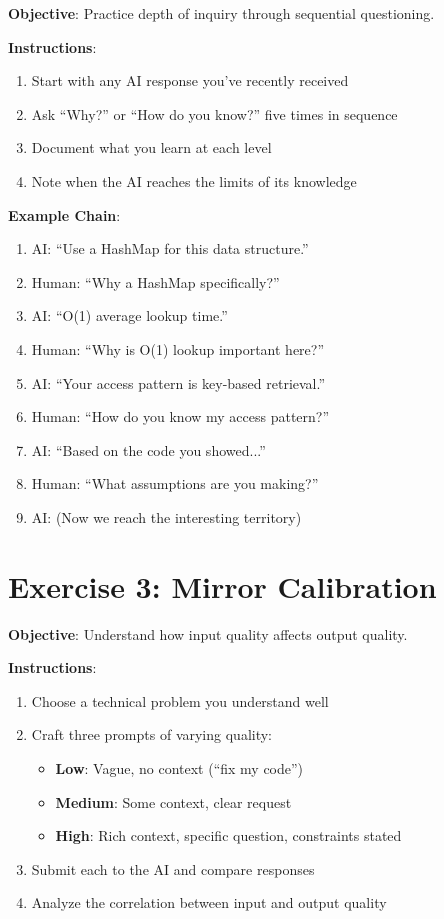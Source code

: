 \textbf{Objective}: Practice depth of inquiry through sequential questioning.

\textbf{Instructions}:
\begin{enumerate}
    \item Start with any AI response you've recently received
    \item Ask ``Why?'' or ``How do you know?'' five times in sequence
    \item Document what you learn at each level
    \item Note when the AI reaches the limits of its knowledge
\end{enumerate}

\textbf{Example Chain}:
\begin{enumerate}
    \item AI: ``Use a HashMap for this data structure.''
    \item Human: ``Why a HashMap specifically?''
    \item AI: ``O(1) average lookup time.''
    \item Human: ``Why is O(1) lookup important here?''
    \item AI: ``Your access pattern is key-based retrieval.''
    \item Human: ``How do you know my access pattern?''
    \item AI: ``Based on the code you showed...''
    \item Human: ``What assumptions are you making?''
    \item AI: (Now we reach the interesting territory)
\end{enumerate}

\section{Exercise 3: Mirror Calibration}

\textbf{Objective}: Understand how input quality affects output quality.

\textbf{Instructions}:
\begin{enumerate}
    \item Choose a technical problem you understand well
    \item Craft three prompts of varying quality:
    \begin{itemize}
        \item \textbf{Low}: Vague, no context (``fix my code'')
        \item \textbf{Medium}: Some context, clear request
        \item \textbf{High}: Rich context, specific question, constraints stated
    \end{itemize}
    \item Submit each to the AI and compare responses
    \item Analyze the correlation between input and output quality
\end{enumerate}

